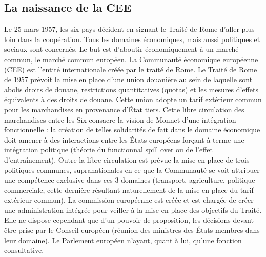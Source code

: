 \documentclass{report}%
\begin{document}
\subsection{La naissance de la CEE}
Le 25 mars 1957, les six pays décident en signant le Traité de Rome d'aller plus loin dans la coopération. Tous les domaines économiques, mais aussi politiques et sociaux sont concernés. Le but est d'aboutir économiquement à un marché commun, le marché commun européen. La Communauté économique européenne (CEE) est l'entité internationale créée par le traité de Rome.
Le Traité de Rome de 1957 prévoit la mise en place d'une union douanière au sein de laquelle sont abolis droits de douane, restrictions quantitatives (quotas) et les mesures d'effets équivalents à des droits de douane. Cette union adopte un tarif extérieur commun pour les marchandises en provenance d'État tiers. Cette libre circulation des marchandises entre les Six consacre la vision de Monnet d'une intégration fonctionnelle : la création de telles solidarités de fait dans le domaine économique doit amener à des interactions entre les États européens forçant à terme une intégration politique (théorie du functionnal spill over ou de l'effet d'entraînement).
Outre la libre circulation est prévue la mise en place de trois politiques communes, supranationales en ce que la Communauté se voit attribuer une compétence exclusive dans ces 3 domaines (transport, agriculture, politique commerciale, cette dernière résultant naturellement de la mise en place du tarif extérieur commun).
La commission européenne est créée et est chargée de créer une administration intégrée pour veiller à la mise en place des objectifs du Traité. Elle ne dispose cependant que d'un pouvoir de proposition, les décisions devant être prise par le Conseil européen (réunion des ministres des États membres dans leur domaine). Le Parlement européen n'ayant, quant à lui, qu'une fonction consultative.
\end{document}
